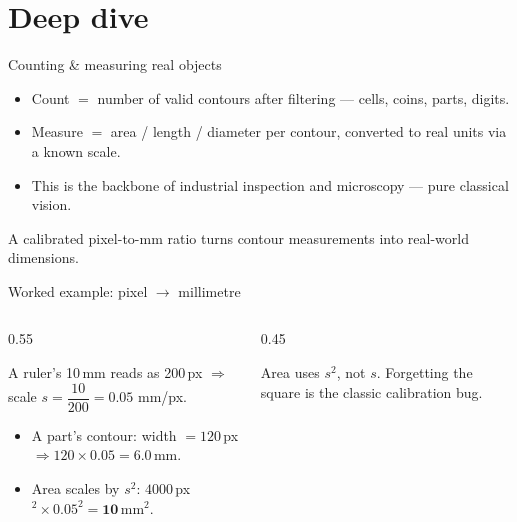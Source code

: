 \documentclass[10pt,aspectratio=169]{beamer}
\begin{document}
\section{Deep dive}

\begin{frame}{Counting \& measuring real objects}
  \begin{itemize}
    \item Count $=$ number of valid contours after filtering — cells, coins, parts, digits.
    \item Measure $=$ area / length / diameter per contour, converted to real units via a known scale.
    \item This is the backbone of industrial inspection and microscopy — pure classical vision.
  \end{itemize}
  \begin{goodbox}
    A calibrated pixel-to-mm ratio turns contour measurements into real-world dimensions.
  \end{goodbox}
\end{frame}

\begin{frame}{Worked example: pixel $\rightarrow$ millimetre}
  \begin{columns}[T]
    \begin{column}{0.55\textwidth}
      \begin{mathbox}[Calibration]
        A ruler's 10\,mm reads as 200\,px $\Rightarrow$ scale $s=\dfrac{10}{200}=0.05$ mm/px.
      \end{mathbox}
      \begin{itemize}\scriptsize
        \item A part's contour: width $=120$\,px $\Rightarrow 120\times0.05=\mathbf{6.0}$\,mm.
        \item Area scales by $s^2$: $4000$\,px$^2\times0.05^2=\mathbf{10}$\,mm$^2$.
      \end{itemize}
    \end{column}
    \begin{column}{0.45\textwidth}
      \begin{badbox}
        Area uses $s^2$, not $s$. Forgetting the square is the classic calibration bug.
      \end{badbox}
    \end{column}
  \end{columns}
\end{frame}
\end{document}
